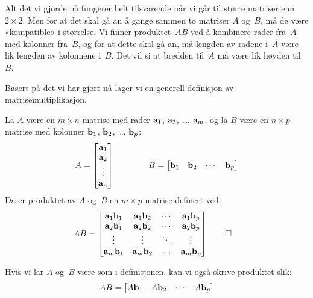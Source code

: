 Alt det vi gjorde nå fungerer helt tilsvarende når vi går til større
matriser enn $2 \times 2$.  Men for at det skal gå an å gange sammen
to matriser $A$ og~$B$, må de være «kompatible» i størrelse.  Vi
finner produktet~$AB$ ved å kombinere rader fra~$A$ med kolonner
fra~$B$, og for at dette skal gå an, må lengden av radene i~$A$ være
lik lengden av kolonnene i~$B$.  Det vil si at bredden til~$A$ må være
lik høyden til~$B$.

Basert på det vi har gjort nå lager vi en generell definisjon av
matrisemultiplikasjon.

\begin{defn}
La $A$ være en $m \times n$-matrise med rader
$\mathbf{a}_1$, $\mathbf{a}_2$, \ldots, $\mathbf{a}_m$,
og la $B$ være en $n \times p$-matrise med kolonner
$\mathbf{b}_1$, $\mathbf{b}_2$, \ldots, $\mathbf{b}_p$:
\[
A = \begin{bmatrix} \mathbf{a}_1 \\ \mathbf{a}_2 \\ \vdots \\ \mathbf{a}_n \end{bmatrix}
\qquad\qquad
B = \begin{bmatrix} \mathbf{b}_1 & \mathbf{b}_2 & \cdots & \mathbf{b}_p \end{bmatrix}
\]
Da er produktet av $A$ og~$B$ en $m \times p$-matrise definert ved:
\begin{align*}
AB &=
\begin{bmatrix}
\mathbf{a}_1 \mathbf{b}_1 & \mathbf{a}_1 \mathbf{b}_2 & \cdots & \mathbf{a}_1 \mathbf{b}_p \\
\mathbf{a}_2 \mathbf{b}_1 & \mathbf{a}_2 \mathbf{b}_2 & \cdots & \mathbf{a}_2 \mathbf{b}_p \\
\vdots          & \vdots          & \ddots & \vdots          \\
\mathbf{a}_m \mathbf{b}_1 & \mathbf{a}_m \mathbf{b}_2 & \cdots & \mathbf{a}_m \mathbf{b}_p
\end{bmatrix}
\qedhere
\end{align*}
\end{defn}

Hvis vi lar $A$ og~$B$ være som i definisjonen, kan vi også skrive
produktet slik:
\[
AB = \begin{bmatrix} A \mathbf{b}_1 & A \mathbf{b}_2 & \cdots & A \mathbf{b}_p \end{bmatrix}
\]

